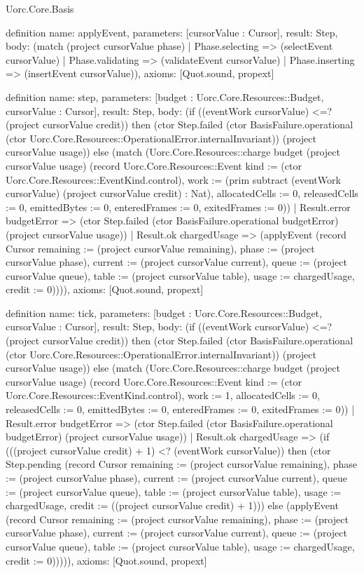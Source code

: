 \begin{lexlean}{Uorc.Core.Basis}
\begin{semanticmodule}
definition{
  name: applyEvent,
  parameters: [cursorValue : Cursor],
  result: Step,
  body: (match (project cursorValue phase)
    | Phase.selecting => (selectEvent cursorValue)
    | Phase.validating => (validateEvent cursorValue)
    | Phase.inserting => (insertEvent cursorValue)),
  axioms: [Quot.sound, propext]
}

definition{
  name: step,
  parameters: [budget : Uorc.Core.Resources::Budget, cursorValue : Cursor],
  result: Step,
  body: (if ((eventWork cursorValue) <=? (project cursorValue credit)) then (ctor Step.failed (ctor BasisFailure.operational (ctor Uorc.Core.Resources::OperationalError.internalInvariant)) (project cursorValue usage)) else (match (Uorc.Core.Resources::charge budget (project cursorValue usage) (record Uorc.Core.Resources::Event {kind := (ctor Uorc.Core.Resources::EventKind.control), work := (prim subtract (eventWork cursorValue) (project cursorValue credit) : Nat), allocatedCells := 0, releasedCells := 0, emittedBytes := 0, enteredFrames := 0, exitedFrames := 0}))
    | Result.error budgetError => (ctor Step.failed (ctor BasisFailure.operational budgetError) (project cursorValue usage))
    | Result.ok chargedUsage => (applyEvent (record Cursor {remaining := (project cursorValue remaining), phase := (project cursorValue phase), current := (project cursorValue current), queue := (project cursorValue queue), table := (project cursorValue table), usage := chargedUsage, credit := 0})))),
  axioms: [Quot.sound, propext]
}

definition{
  name: tick,
  parameters: [budget : Uorc.Core.Resources::Budget, cursorValue : Cursor],
  result: Step,
  body: (if ((eventWork cursorValue) <=? (project cursorValue credit)) then (ctor Step.failed (ctor BasisFailure.operational (ctor Uorc.Core.Resources::OperationalError.internalInvariant)) (project cursorValue usage)) else (match (Uorc.Core.Resources::charge budget (project cursorValue usage) (record Uorc.Core.Resources::Event {kind := (ctor Uorc.Core.Resources::EventKind.control), work := 1, allocatedCells := 0, releasedCells := 0, emittedBytes := 0, enteredFrames := 0, exitedFrames := 0}))
    | Result.error budgetError => (ctor Step.failed (ctor BasisFailure.operational budgetError) (project cursorValue usage))
    | Result.ok chargedUsage => (if (((project cursorValue credit) + 1) <? (eventWork cursorValue)) then (ctor Step.pending (record Cursor {remaining := (project cursorValue remaining), phase := (project cursorValue phase), current := (project cursorValue current), queue := (project cursorValue queue), table := (project cursorValue table), usage := chargedUsage, credit := ((project cursorValue credit) + 1)})) else (applyEvent (record Cursor {remaining := (project cursorValue remaining), phase := (project cursorValue phase), current := (project cursorValue current), queue := (project cursorValue queue), table := (project cursorValue table), usage := chargedUsage, credit := 0}))))),
  axioms: [Quot.sound, propext]
}


\end{semanticmodule}
\end{lexlean}

